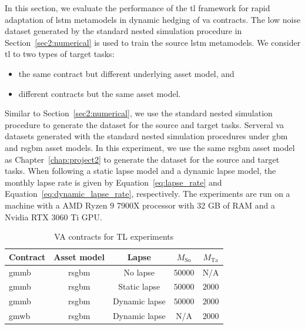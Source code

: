 In this section, we evaluate the performance of the \gls{tl} framework for rapid adaptation of \gls{lstm} metamodels in dynamic hedging of \gls{va} contracts.
The low noise dataset generated by the standard nested simulation procedure in Section~\ref{sec2:numerical} is used to train the source \gls{lstm} metamodels.
We consider \gls{tl} to two types of target tasks: 
\begin{itemize}
    \item the same contract but different underlying asset model, and
    \item different contracts but the same asset model.
\end{itemize}  
Similar to Section~\ref{sec2:numerical}, we use the standard nested simulation procedure to generate the dataset for the source and target tasks.
Serveral \gls{va} datasets generated with the standard nested simulation procedures under \gls{gbm} and \gls{rsgbm} asset models.
In this experiment, we use the same \gls{rsgbm} asset model as Chapter~\ref{chap:project2} to generate the dataset for the source and target tasks.
When following a static lapse model and a dynamic lapse model, the monthly lapse rate is given by Equation~\ref{eq:lapse_rate} and Equation~\ref{eq:dynamic_lapse_rate}, respectively.
The experiments are run on a machine with a AMD Ryzen 9 7900X processor with 32 GB of RAM and a Nvidia RTX $\num{3060}$ Ti GPU.

\begin{table}[ht!] 
    \centering
    \begin{tabular}{lcccc} 
    \toprule
    \textbf{Contract} & \textbf{Asset model} & \textbf{Lapse} & \textbf{$M_{\text{So}}$}  & \textbf{$M_{\text{Ta}}$}\\
    \midrule
    \gls{gmmb} & \gls{rsgbm} & No lapse & $\num{50000}$ & N/A \\
    \gls{gmmb} & \gls{rsgbm} & Static lapse & $\num{50000}$ & $\num{2000}$ \\
    \gls{gmmb} & \gls{rsgbm} & Dynamic lapse & $\num{50000}$ & $\num{2000}$ \\
    \gls{gmwb} & \gls{rsgbm} & Dynamic lapse & N/A & $\num{2000}$ \\
    \bottomrule
    \end{tabular}
    \caption{VA contracts for TL experiments}
    \label{tab3:contracts}
\end{table}

